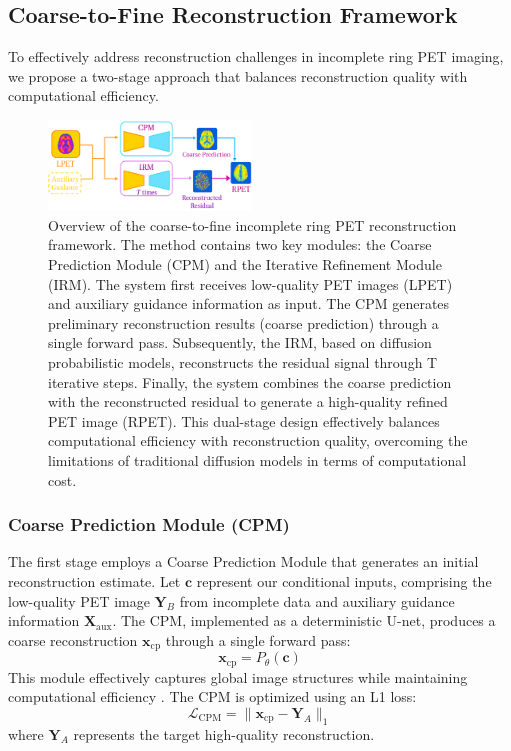 \documentclass[
reprint,
superscriptaddress,
nofootinbib,
amsmath,amssymb,
aps,
prd,
]{revtex4-2}
\begin{document}
\subsection{Coarse-to-Fine Reconstruction Framework}

To effectively address reconstruction challenges in incomplete ring PET imaging, we propose a two-stage approach that balances reconstruction quality with computational efficiency.
\begin{figure}[ht]
    \centering
    \includegraphics[width=0.48\textwidth]{Images/C2F.png}
    \caption{Overview of the coarse-to-fine incomplete ring PET reconstruction framework. The method contains two key modules: the Coarse Prediction Module (CPM) and the Iterative Refinement Module (IRM). The system first receives low-quality PET images (LPET) and auxiliary guidance information as input. The CPM generates preliminary reconstruction results (coarse prediction) through a single forward pass. Subsequently, the IRM, based on diffusion probabilistic models, reconstructs the residual signal through T iterative steps. Finally, the system combines the coarse prediction with the reconstructed residual to generate a high-quality refined PET image (RPET). This dual-stage design effectively balances computational efficiency with reconstruction quality, overcoming the limitations of traditional diffusion models in terms of computational cost.}
    \label{fig:coarse_to_fine_framework}
\end{figure}

\subsubsection{Coarse Prediction Module (CPM)}
The first stage employs a Coarse Prediction Module that generates an initial reconstruction estimate. Let \(\mathbf{c}\) represent our conditional inputs, comprising the low-quality PET image \(\mathbf{Y}_B\) from incomplete data and auxiliary guidance information \(\mathbf{X}_{\text{aux}}\). The CPM, implemented as a deterministic U-net, produces a coarse reconstruction \(\mathbf{x}_\text{cp}\) through a single forward pass:
\begin{equation}
\mathbf{x}_\text{cp} = P_\theta(\mathbf{c})
\end{equation}
This module effectively captures global image structures while maintaining computational efficiency \cite{saharia2023}. The CPM is optimized using an L1 loss:
\begin{equation}
\mathcal{L}_{\text{CPM}} = \|\mathbf{x}_\text{cp} - \mathbf{Y}_A\|_1
\end{equation}
where \(\mathbf{Y}_A\) represents the target high-quality reconstruction.
\end{document}
